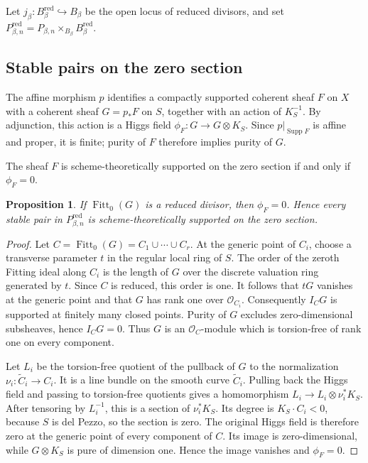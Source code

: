 \documentclass[11pt,reqno]{amsart}
\newtheorem{proposition}[theorem]{Proposition}
\theoremstyle{definition}
\newcommand{\Ocal}{\mathcal O}
\newcommand{\Supp}{\operatorname{Supp}}
\newcommand{\Fitt}{\operatorname{Fitt}}
\newcommand{\red}{\mathrm{red}}
\begin{document}
Let $j_\beta:B_\beta^{\red}\hookrightarrow B_\beta$ be the open locus of
reduced divisors, and set
$P_{\beta,n}^{\red}=P_{\beta,n}\times_{B_\beta}B_\beta^{\red}$.

\subsection{Stable pairs on the zero section}

The affine morphism $p$ identifies a compactly supported coherent sheaf
$F$ on $X$ with a coherent sheaf $G=p_*F$ on $S$, together with an
action of $K_S^{-1}$.  By adjunction, this action is a Higgs field
$\phi_F:G\to G\otimes K_S$.
Since $p|_{\Supp F}$ is affine and proper, it is finite; purity of $F$
therefore implies purity of $G$.

The sheaf $F$ is scheme-theoretically supported on the zero section if and
only if $\phi_F=0$.

\begin{proposition}\label{prop:reduced-zero-section}
If $\Fitt_0(G)$ is a reduced divisor, then $\phi_F=0$.  Hence every
stable pair in $P_{\beta,n}^{\red}$ is scheme-theoretically supported on
the zero section.
\end{proposition}

\begin{proof}
Let $C=\Fitt_0(G)=C_1\cup\cdots\cup C_r$.  At the generic point of
$C_i$, choose a transverse parameter $t$ in the regular local ring of $S$.
The order of the zeroth Fitting ideal along $C_i$ is the length of $G$ over
the discrete valuation ring generated by $t$.  Since $C$ is reduced, this
order is one.  It follows that $tG$ vanishes at the generic point and that
$G$ has rank one over $\Ocal_{C_i}$.  Consequently $I_CG$ is supported at
finitely many closed points.  Purity of $G$ excludes zero-dimensional
subsheaves, hence $I_CG=0$.  Thus $G$ is an $\Ocal_C$-module which is
torsion-free of rank one on every component.

Let $L_i$ be the torsion-free quotient of the pullback of $G$ to the
normalization $\nu_i:\widetilde C_i\to C_i$.  It is a line bundle on the
smooth curve $\widetilde C_i$.  Pulling back the Higgs field and passing to
torsion-free quotients gives a homomorphism
$L_i\to L_i\otimes\nu_i^*K_S$.  After tensoring by $L_i^{-1}$, this is a
section of $\nu_i^*K_S$.  Its degree is $K_S\cdot C_i<0$, because $S$ is del
Pezzo, so the section is zero.  The original Higgs field is therefore zero
at the generic point of every component of $C$.  Its image is
zero-dimensional, while $G\otimes K_S$ is pure of dimension one.  Hence the
image vanishes and $\phi_F=0$.
\end{proof}
\end{document}
